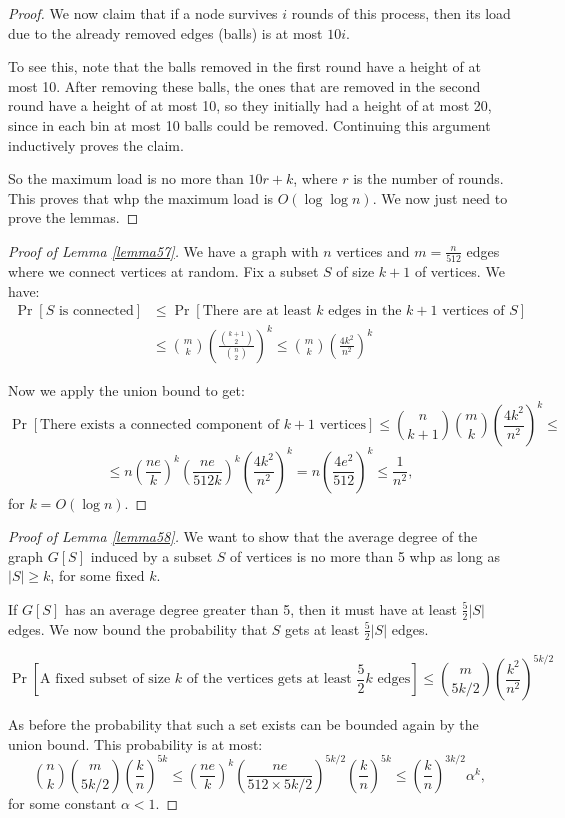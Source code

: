 \begin{proof}
We now claim that if a node survives $i$ rounds of this process, then its load due to the already removed edges (balls) is at most $10i$. 

To see this, note that the balls removed in the first round have a height of at most 10. After removing these balls, the ones that are removed in the second round have a height of at most 10, so they initially had a height of at most 20, since in each bin at most 10 balls could be removed. Continuing this argument inductively proves the claim.

So the maximum load is no more than $10r + k$, where $r$ is the number of rounds. This proves that whp the maximum load is $O(\log \log n)$. We now just need to prove the lemmas.
\end{proof}

\begin{proof}[Proof of Lemma \ref{lemma57}]
We have a graph with $n$ vertices and $m = \frac{n}{512}$ edges where we connect vertices at random. Fix a subset $S$ of size $k+1$ of vertices. We have:
\begin{align*}
\Pr[S\text{ is connected}] &\leq \Pr[\text{There are at least } k \text{ edges in the } k+1 \text{ vertices of } S]\\
&\leq \binom{m}{k} \left(\frac{\binom{k+1}{2}}{\binom{n}{2}}\right)^k \leq \binom{m}{k} \left( \frac{4k^2}{n^2} \right)^k
\end{align*}

Now we apply the union bound to get:
$$
\Pr[\text{There exists a connected component of } k+1 \text{ vertices}] \leq \binom{n}{k+1} \binom{m}{k} \left( \frac{4k^2}{n^2} \right)^k \leq$$ $$\leq n \left(\frac{ne}{k} \right)^k \left(\frac{ne}{512k} \right)^k \left(\frac{4k^2}{n^2} \right)^k = n \left(\frac{4e^2}{512} \right)^k \leq \frac{1}{n^2},
$$
for $k = O(\log n)$.
\end{proof}

\begin{proof}[Proof of Lemma \ref{lemma58}]
We want to show that the average degree of the graph $G[S]$ induced by a subset $S$ of vertices is no more than 5 whp as long as $\vert S \vert \geq k$, for some fixed $k$.

If $G[S]$ has an average degree greater than 5, then it must have at least $\frac{5}{2}\vert S \vert$ edges. We now bound the probability that $S$ gets at least $\frac{5}{2}\vert S \vert$ edges.

$$
\Pr[\text{A fixed subset of size } k \text{ of the vertices gets at least } \frac{5}{2}k \text{ edges}] \leq \binom{m}{5k/2} \left( \frac{k^2}{n^2}\right)^{5k/2}
$$

As before the probability that such a set exists can be bounded again by the union bound. This probability is at most:
$$\binom{n}{k} \binom{m}{5k/2} \left( \frac{k}{n}\right)^{5k} \leq
\left( \frac{ne}{k} \right)^k \left( \frac{ne}{512 \times 5k/2} \right)^{5k/2} \left( \frac{k}{n} \right)^{5k} \leq \left( \frac{k}{n} \right)^{3k/2} \alpha^k,
$$
for some constant $\alpha < 1$.
\end{proof}

